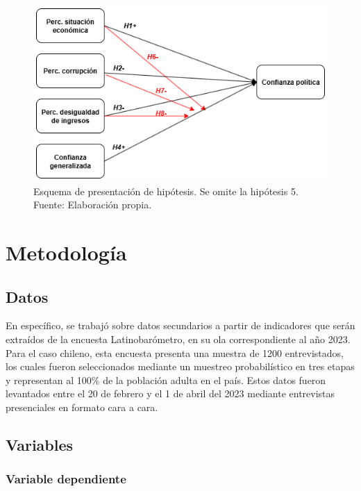 \documentclass[12pt,twoside]{templates/facsothesis}
\begin{document}
\begin{figure}[!ht]

{\centering \includegraphics[width=0.8\linewidth,]{IPO/output/graphs/hipotesis_tesis} 

}

\caption{Esquema de presentación de hipótesis. Se omite la hipótesis 5. Fuente: Elaboración propia.}\label{fig:grafico-1}
\end{figure}

\chapter{Metodología}\label{metodologuxeda}

\section{Datos}\label{datos}

En específico, se trabajó sobre datos secundarios a partir de indicadores que serán extraídos de la encuesta Latinobarómetro, en su ola correspondiente al año 2023. Para el caso chileno, esta encuesta presenta una muestra de 1200 entrevistados, los cuales fueron seleccionados mediante un muestreo probabilístico en tres etapas y representan al 100\% de la población adulta en el país. Estos datos fueron levantados entre el 20 de febrero y el 1 de abril del 2023 mediante entrevistas presenciales en formato cara a cara.

\section{Variables}\label{variables}

\subsection{Variable dependiente}\label{variable-dependiente}
\end{document}
